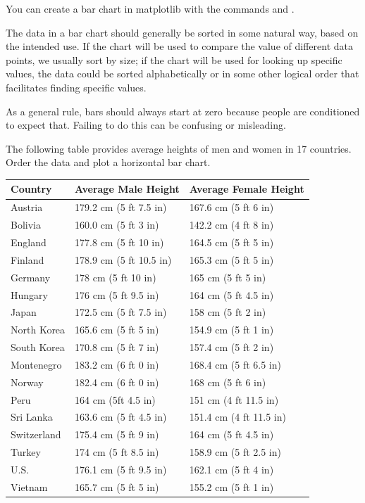 You can create a bar chart in matplotlib with the commands  and .

The data in a bar chart should generally be sorted in some natural way, based on the intended use.  If the chart will be used to compare the value of different data points, we usually sort by size; if the chart will be used for looking up specific values, the data could be sorted alphabetically or in some other logical order that facilitates finding specific values.

As a general rule, bars should always start at zero because people are conditioned to expect that.  Failing to do this can be confusing or misleading.  

\begin{problem}

The following table provides average heights of men and women in 17 countries. Order the data and plot a horizontal bar chart. 


\begin{tabular}{ | l || l | l | }
\hline
Country & Average Male Height & Average Female Height \\
\hline
Austria & 179.2 cm (5 ft 7.5 in) & 167.6 cm (5 ft 6 in) \\
Bolivia & 160.0 cm (5 ft 3 in) & 142.2 cm (4 ft 8 in) \\
England & 177.8 cm (5 ft 10 in) & 164.5 cm (5 ft 5 in) \\
Finland & 178.9 cm (5 ft 10.5 in) & 165.3 cm (5 ft 5 in) \\
Germany & 178 cm (5 ft 10 in) & 165 cm (5 ft 5 in) \\
Hungary & 176 cm (5 ft 9.5 in) & 164 cm (5 ft 4.5 in) \\
Japan & 172.5 cm (5 ft 7.5 in) & 158 cm (5 ft 2 in) \\
North Korea & 165.6 cm (5 ft 5 in) & 154.9 cm (5 ft 1 in) \\
South Korea & 170.8 cm (5 ft 7 in) & 157.4 cm (5 ft 2 in) \\
Montenegro & 183.2 cm (6 ft 0 in) & 168.4 cm (5 ft 6.5 in) \\
Norway & 182.4 cm (6 ft 0 in) & 168 cm (5 ft 6 in) \\
Peru & 164 cm (5ft 4.5 in) & 151 cm (4 ft 11.5 in) \\
Sri Lanka & 163.6 cm (5 ft 4.5 in) & 151.4 cm (4 ft 11.5 in) \\
Switzerland & 175.4 cm (5 ft 9 in) & 164 cm (5 ft 4.5 in) \\
Turkey & 174 cm (5 ft 8.5 in) & 158.9 cm (5 ft 2.5 in) \\
U.S. & 176.1 cm (5 ft 9.5 in) & 162.1 cm (5 ft 4 in) \\
Vietnam & 165.7 cm (5 ft 5 in) & 155.2 cm (5 ft 1 in) \\
\hline
\end{tabular}
\label{prob1}
\end{problem}





